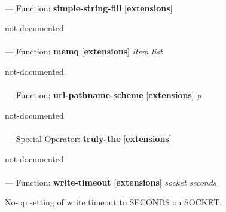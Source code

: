\paragraph{}
\label{EXTENSIONS:SIMPLE-STRING-FILL}
--- Function: \textbf{simple-string-fill} [\textbf{extensions}] \textit{}

\begin{adjustwidth}{5em}{5em}
not-documented
\end{adjustwidth}

\paragraph{}
\label{EXTENSIONS:MEMQ}
--- Function: \textbf{memq} [\textbf{extensions}] \textit{item list}

\begin{adjustwidth}{5em}{5em}
not-documented
\end{adjustwidth}

\paragraph{}
\label{EXTENSIONS:URL-PATHNAME-SCHEME}
--- Function: \textbf{url-pathname-scheme} [\textbf{extensions}] \textit{p}

\begin{adjustwidth}{5em}{5em}
not-documented
\end{adjustwidth}

\paragraph{}
\label{EXTENSIONS:TRULY-THE}
--- Special Operator: \textbf{truly-the} [\textbf{extensions}] \textit{}

\begin{adjustwidth}{5em}{5em}
not-documented
\end{adjustwidth}

\paragraph{}
\label{EXTENSIONS:WRITE-TIMEOUT}
--- Function: \textbf{write-timeout} [\textbf{extensions}] \textit{socket seconds}

\begin{adjustwidth}{5em}{5em}
No-op setting of write timeout to SECONDS on SOCKET.
\end{adjustwidth}

